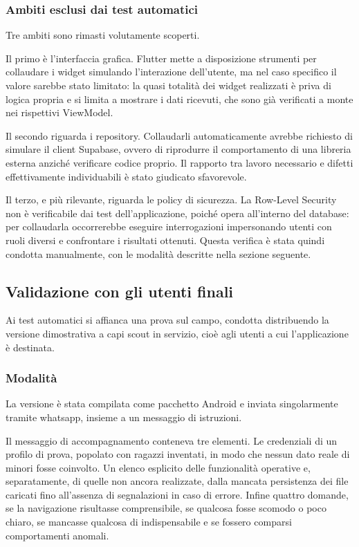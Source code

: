 \documentclass[11pt]{article}
\numberwithin{figure}{section}
\begin{document}
\subsubsection{Ambiti esclusi dai test automatici}

Tre ambiti sono rimasti volutamente scoperti.

Il primo è l'interfaccia grafica. Flutter mette a disposizione strumenti per collaudare i widget simulando l'interazione dell'utente, ma nel caso specifico il valore sarebbe stato limitato: la quasi totalità dei widget realizzati è priva di logica propria e si limita a mostrare i dati ricevuti, che sono già verificati a monte nei rispettivi ViewModel.

Il secondo riguarda i repository. Collaudarli automaticamente avrebbe richiesto di simulare il client Supabase, ovvero di riprodurre il comportamento di una libreria esterna anziché verificare codice proprio. Il rapporto tra lavoro necessario e difetti effettivamente individuabili è stato giudicato sfavorevole.

Il terzo, e più rilevante, riguarda le policy di sicurezza. La Row-Level Security non è verificabile dai test dell'applicazione, poiché opera all'interno del database: per collaudarla occorrerebbe eseguire interrogazioni impersonando utenti con ruoli diversi e confrontare i risultati ottenuti. Questa verifica è stata quindi condotta manualmente, con le modalità descritte nella sezione seguente.

\subsection{Validazione con gli utenti finali}

Ai test automatici si affianca una prova sul campo, condotta distribuendo la versione dimostrativa a capi scout in servizio, cioè agli utenti a cui l'applicazione è destinata.

\subsubsection{Modalità}

La versione è stata compilata come pacchetto Android e inviata singolarmente tramite whatsapp, insieme a un messaggio di istruzioni.

Il messaggio di accompagnamento conteneva tre elementi. Le credenziali di un profilo di prova, popolato con ragazzi inventati, in modo che nessun dato reale di minori fosse coinvolto. Un elenco esplicito delle funzionalità operative e, separatamente, di quelle non ancora realizzate, dalla mancata persistenza dei file caricati fino all'assenza di segnalazioni in caso di errore. Infine quattro domande, se la navigazione risultasse comprensibile, se qualcosa fosse scomodo o poco chiaro, se mancasse qualcosa di indispensabile e se fossero comparsi comportamenti anomali.
\end{document}
